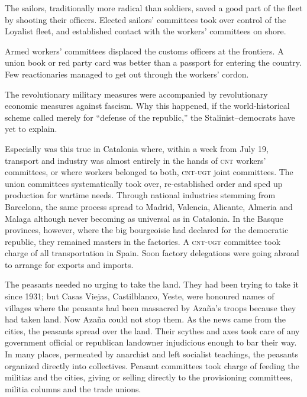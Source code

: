 The sailors, traditionally more radical than soldiers, saved a good part of the fleet by shooting their officers. Elected sailors’ committees took over control of the Loyalist fleet, and established contact with the workers’ committees on shore.

Armed workers’ committees displaced the customs officers at the frontiers. A union book or red party card was better than a passport for entering the country. Few reactionaries managed to get out through the workers’ cordon.

\dinkus

The revolutionary military measures were accompanied by revolutionary economic measures against fascism. Why this happened, if the world-historical scheme called merely for ``defense of the republic,'' the Stalinist--democrats have yet to explain.

Especially was this true in Catalonia where, within a week from July 19, transport and industry was almost entirely in the hands of \textsc{cnt} workers’ committees, or where workers belonged to both, \textsc{cnt-ugt} joint committees. The union committees systematically took over, re-established order and sped up production for wartime needs. Through national industries stemming from Barcelona, the same process spread to Madrid, Valencia, Alicante, Almeria and Malaga although never becoming as universal as in Catalonia. In the Basque provinces, however, where the big bourgeoisie had declared for the democratic republic, they remained masters in the factories. A \textsc{cnt-ugt} committee took charge of all transportation in Spain. Soon factory delegations were going abroad to arrange for exports and imports.
\noclub

The peasants needed no urging to take the land. They had been trying to take it since 1931; but Casas Viejas, Castilblanco, Yeste, were honoured names of villages where the peasants had been massacred by Azaña’s troops because they had taken land. Now Azaña could not stop them. As the news came from the cities, the peasants spread over the land. Their scythes and axes took care of any government official or republican landowner injudicious enough to bar their way. In many places, permeated by anarchist and left socialist teachings, the peasants organized directly into collectives. Peasant committees took charge of feeding the militias and the cities, giving or selling directly to the provisioning committees, militia columns and the trade unions.

